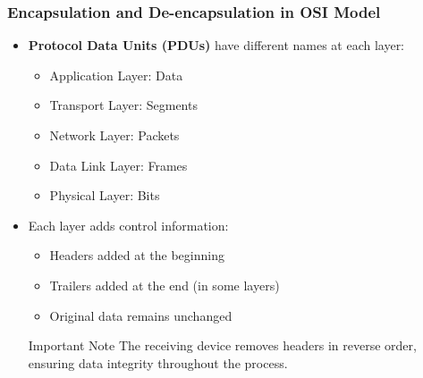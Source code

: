 \documentclass{beamer}
\begin{document}
\begin{frame}
    \frametitle{Encapsulation and De-encapsulation in OSI Model}
    
    \begin{itemize}
        \item \textbf{Protocol Data Units (PDUs)} have different names at each layer:
        \begin{itemize}
            \item Application Layer: Data
            \item Transport Layer: Segments
            \item Network Layer: Packets
            \item Data Link Layer: Frames
            \item Physical Layer: Bits
        \end{itemize}
        
        \item Each layer adds control information:
        \begin{itemize}
            \item Headers added at the beginning
            \item Trailers added at the end (in some layers)
            \item Original data remains unchanged
        \end{itemize}
        
        \begin{alertblock}{Important Note}
            The receiving device removes headers in reverse order, ensuring data integrity throughout the process.
        \end{alertblock}
    \end{itemize}
\end{frame}
\end{document}
